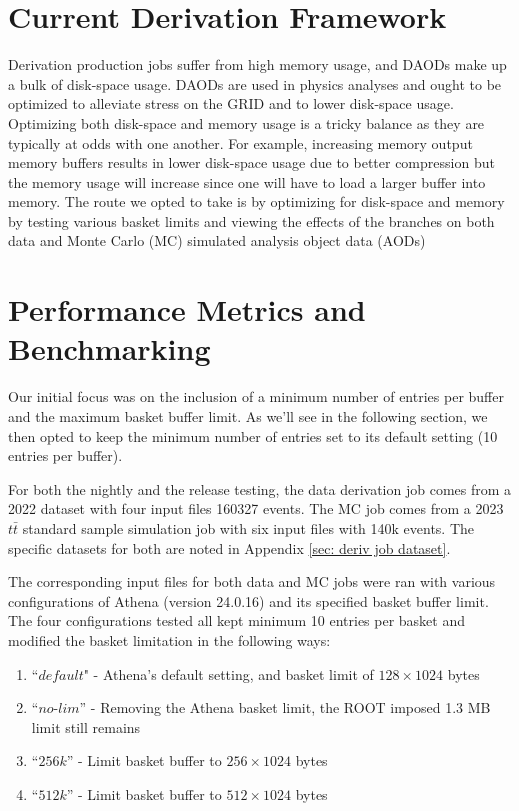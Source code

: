 \section{Current Derivation Framework}
Derivation production jobs suffer from high memory usage, and DAODs make up a bulk of disk-space usage. 
DAODs are used in physics analyses and ought to be optimized to alleviate stress on the GRID and to lower disk-space usage. 
Optimizing both disk-space and memory usage is a tricky balance as they are typically at odds with one another. 
For example, increasing memory output memory buffers results in lower disk-space usage due to better compression but the memory usage will increase since one will have to load a larger buffer into memory. 
The route we opted to take is by optimizing for disk-space and memory by testing various basket limits and viewing the effects of the branches on both data and Monte Carlo (MC) simulated analysis object data (AODs)

\section{Performance Metrics and Benchmarking}

Our initial focus was on the inclusion of a minimum number of entries per buffer and the maximum basket buffer limit.
As we'll see in the following section, we then opted to keep the minimum number of entries set to its default setting (10 entries per buffer). 


For both the nightly and the release testing, the data derivation job comes from a 2022 dataset with four input files 160327 events. 
The MC job comes from a 2023 $t\bar{t}$ standard sample simulation job with six input files with 140k events. 
The specific datasets for both are noted in Appendix \ref{sec: deriv job dataset}. 

The corresponding input files for both data and MC jobs were ran with various configurations of Athena (version 24.0.16) and its specified basket buffer limit. 
The four configurations tested all kept minimum 10 entries per basket and modified the basket limitation in the following ways: 

\begin{enumerate}
    \item ``$\textit{default}$" - Athena's default setting, and basket limit of $128\times1024$ bytes
    \item ``$\textit{no-lim}$'' - Removing the Athena basket limit, the ROOT imposed 1.3 MB limit still remains
    \item ``$\textit{256k}$'' - Limit basket buffer to $256\times1024$ bytes
    \item ``$\textit{512k}$'' - Limit basket buffer to $512\times1024$ bytes
\end{enumerate}

